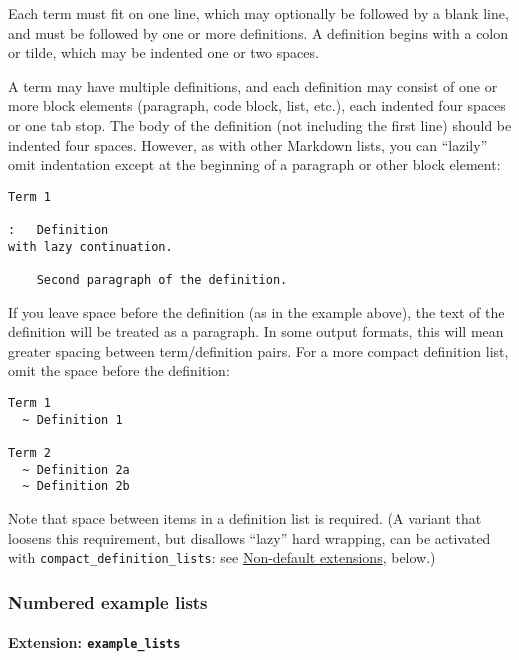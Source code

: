 Each term must fit on one line, which may optionally be followed by a
blank line, and must be followed by one or more definitions. A
definition begins with a colon or tilde, which may be indented one or
two spaces.

A term may have multiple definitions, and each definition may consist of
one or more block elements (paragraph, code block, list, etc.), each
indented four spaces or one tab stop. The body of the definition (not
including the first line) should be indented four spaces. However, as
with other Markdown lists, you can ``lazily'' omit indentation except at
the beginning of a paragraph or other block element:

\begin{verbatim}
Term 1

:   Definition
with lazy continuation.

    Second paragraph of the definition.
\end{verbatim}

If you leave space before the definition (as in the example above), the
text of the definition will be treated as a paragraph. In some output
formats, this will mean greater spacing between term/definition pairs.
For a more compact definition list, omit the space before the
definition:

\begin{verbatim}
Term 1
  ~ Definition 1

Term 2
  ~ Definition 2a
  ~ Definition 2b
\end{verbatim}

Note that space between items in a definition list is required. (A
variant that loosens this requirement, but disallows ``lazy'' hard
wrapping, can be activated with \texttt{compact\_definition\_lists}: see
\protect\hyperlink{non-default-extensions}{Non-default extensions},
below.)

\hypertarget{numbered-example-lists}{%
\subsubsection{Numbered example lists}\label{numbered-example-lists}}

\hypertarget{extension-example_lists}{%
\paragraph{\texorpdfstring{Extension:
\texttt{example\_lists}}{Extension: example\_lists}}\label{extension-example_lists}}

